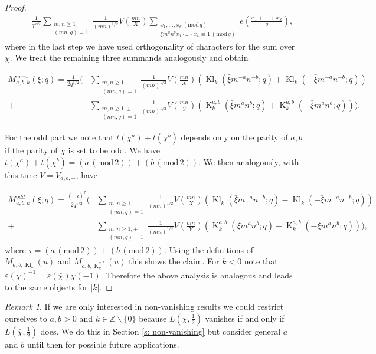 \documentclass[12pt]{amsart}
\theoremstyle{plain}
\theoremstyle{definition}
\theoremstyle{remark}
\newtheorem{rem}[thm]{Remark}
\numberwithin{equation}{section}
\newcommand{\ZZ}{\mathbb{Z}}
\newcommand{\mods}[1]{\,(\mathrm{mod}\,{#1})}
\renewcommand{\geq}{\geqslant}
\DeclareMathOperator{\Kl}{Kl}%
\DeclareMathOperator{\K}{K} %
\begin{document}
\begin{proof}
\begin{align*}
     & =\frac{1}{q^{k/2}}\sum_{\substack{m,n\geq 1\\(mn,q)=1}}\frac{1}{(mn)^{1/2}}V\left(\frac{mn}{X}\right)\sum_{\substack{ x_1,\ldots, x_k \mods q\\ \xi m^an^b x_1\cdot \ldots \cdot  x_k \equiv 1\mods q}}e\left(\frac{ x_1+\ldots+ x_k}{q}\right),
\end{align*}
where in the last step we have used orthogonality of characters for the sum over $\chi$. 
We treat the remaining three summands analogously and obtain 




\begin{align*}
M_{a,b,k}^{even}(\xi;q)=\frac{1}{2q^{1/2}}\Bigg(&\sum_{\substack{m,n\geq 1\\(mn,q)=1}}\frac{1}{(mn)^{1/2}}V\left(\frac{mn}{X}\right)\left(\Kl_k(\bar \xi m^{-a}n^{-b};q)+\Kl_k(-\bar \xi m^{-a}n^{-b};q)\right)\\ + &\sum_{\substack{m,n\geq 1,\pm\\(mn,q)=1}}\frac{1}{(mn)^{1/2}}V\left(\frac{mn}{Y}\right)\left(\K^{a,b}_k(\bar \xi m^{a}n^{b};q)+\K^{a,b}_k(- \bar \xi m^{a}n^{b};q)\right)\Bigg). \end{align*}


For the odd part we note that $t(\chi^a)+t(\chi^b)$ depends only on the parity of $a,b$ if the parity of $\chi$ is set to be odd. We have $t(\chi^a)+t(\chi^b)=(a\mods 2)+(b\mods 2)$.  We then analogously, with this time $V=V_{a,b,-}$, have


\begin{align*}
M_{a,b,k}^{odd}(\xi;q)=\frac{(-i)^{\tau}}{2q^{1/2}}\Bigg(&\sum_{\substack{m,n\geq 1\\(mn,q)=1}}\frac{1}{(mn)^{1/2}}V\left(\frac{mn}{X}\right)\left(\Kl_k(\bar \xi m^{-a}n^{-b};q)-\Kl_k(-\bar \xi m^{-a}n^{-b};q)\right)\\ + &\sum_{\substack{m,n\geq 1,\pm\\(mn,q)=1}}\frac{1}{(mn)^{1/2}}V\left(\frac{mn}{Y}\right)\left(\K^{a,b}_k(\bar \xi m^{a}n^{b};q)-\K^{a,b}_k(-\bar \xi m^{a}n^{b};q)\right)\Bigg), \end{align*}
where $\tau=(a\mods 2)+(b\mods 2)$.
Using the definitions of $M_{a,b,\Kl_k}(u)$ and $M_{a,b,\K_k^{a,b}}(u)$ this shows the claim. 
For $k<0$ note that $\varepsilon(\chi)^{-1}=\varepsilon(\bar\chi)\chi(-1)$. Therefore the above analysis is analogous and leads to the same objects for $|k|$.
\end{proof}

\begin{rem}
    If we are only interested in non-vanishing results we could restrict ourselves to $a,b>0$ and $k\in \ZZ\smallsetminus \{0\}$ because $L(\chi,\tfrac 12)$ vanishes if and only if $L(\bar\chi,\tfrac 12)$ does. We do this in Section \ref{s: non-vanishing} but consider general $a$ and $b$ until then for possible future applications.
\end{rem}
\end{document}
